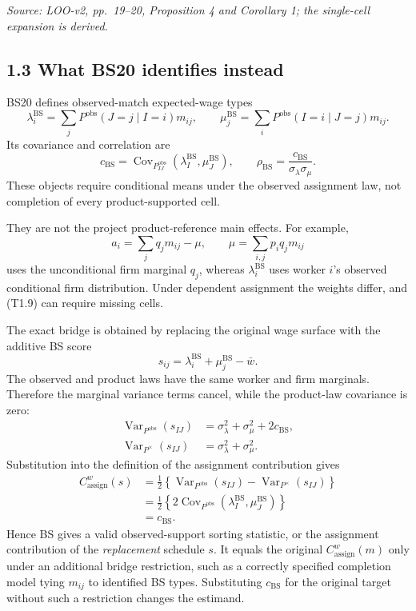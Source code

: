 \documentclass[11pt]{article}
\begin{document}
\textit{Source: LOO-v2, pp.\ 19--20, Proposition 4 and Corollary 1; the
single-cell expansion is derived.}

\subsection{1.3 What BS20 identifies instead}

BS20 defines observed-match expected-wage types
\[
\lambda_i^{\mathrm{BS}}
=
\sum_jP^{\mathrm{obs}}(J=j\mid I=i)m_{ij},
\qquad
\mu_j^{\mathrm{BS}}
=
\sum_iP^{\mathrm{obs}}(I=i\mid J=j)m_{ij}.
\tag{T1.7}
\]
Its covariance and correlation are
\[
c_{\mathrm{BS}}
=
\operatorname{Cov}_{P^{\mathrm{obs}}_{IJ}}
(\lambda_I^{\mathrm{BS}},\mu_J^{\mathrm{BS}}),
\qquad
\rho_{\mathrm{BS}}
=
\frac{c_{\mathrm{BS}}}{\sigma_\lambda\sigma_\mu}.
\tag{T1.8}
\]
These objects require conditional means under the observed assignment law,
not completion of every product-supported cell.

They are not the project product-reference main effects.  For example,
\[
a_i=\sum_jq_jm_{ij}-\mu,
\qquad
\mu=\sum_{i,j}p_iq_jm_{ij}
\tag{T1.9}
\]
uses the unconditional firm marginal \(q_j\), whereas
\(\lambda_i^{\mathrm{BS}}\) uses
worker \(i\)'s observed conditional firm distribution.  Under dependent
assignment the weights differ, and (T1.9) can require missing cells.

The exact bridge is obtained by replacing the original wage surface with the
additive BS score
\[
s_{ij}=\lambda_i^{\mathrm{BS}}+\mu_j^{\mathrm{BS}}-\bar w.
\tag{T1.10}
\]
The observed and product laws have the same worker and firm marginals.
Therefore the marginal variance terms cancel, while the product-law
covariance is zero:
\[
\begin{aligned}
\operatorname{Var}_{P^{\mathrm{obs}}}(s_{IJ})
&=
\sigma_\lambda^2+\sigma_\mu^2+2c_{\mathrm{BS}},\\
\operatorname{Var}_{P^\times}(s_{IJ})
&=
\sigma_\lambda^2+\sigma_\mu^2.
\end{aligned}
\tag{T1.10a}
\]
Substitution into the definition of the assignment contribution gives
\[
\begin{aligned}
C^w_{\mathrm{assign}}(s)
&=
\frac12\left\{
\operatorname{Var}_{P^{\mathrm{obs}}}(s_{IJ})
-\operatorname{Var}_{P^\times}(s_{IJ})
\right\}\\
&=
\frac12\left\{
2\operatorname{Cov}_{P^{\mathrm{obs}}}
(\lambda_I^{\mathrm{BS}},\mu_J^{\mathrm{BS}})
\right\}\\
&=c_{\mathrm{BS}}.
\end{aligned}
\tag{T1.11}
\]
Hence BS gives a valid observed-support sorting statistic, or the assignment
contribution of the \emph{replacement} schedule \(s\).  It equals the
original \(C^w_{\mathrm{assign}}(m)\) only under an additional bridge
restriction, such as a correctly specified completion model tying \(m_{ij}\)
to identified BS types.  Substituting \(c_{\mathrm{BS}}\) for the original
target without such a restriction changes the estimand.
\end{document}
